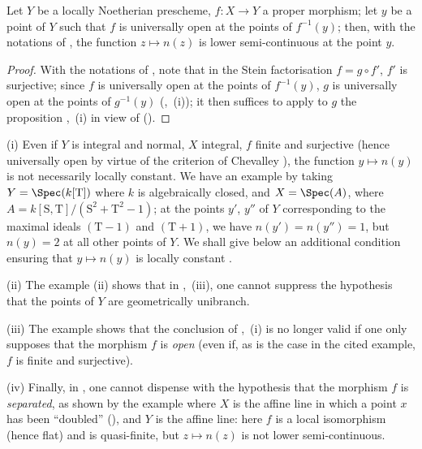 \begin{corollary}[15.5.4]
\label{IV.15.5.4}
Let $Y$ be a locally Noetherian prescheme, $f:X\to Y$ a proper morphism; let $y$ be a point of $Y$ such that $f$ is universally open at the points of $f^{-1}(y)$;
then, with the notations of , the function $z\mapsto n(z)$ is lower semi-continuous at the point $y$.
\end{corollary}

\begin{proof}
With the notations of , note that in the Stein factorisation $f=g\circ f'$, $f'$ is surjective; since $f$ is universally open at the points of $f^{-1}(y)$, $g$ is universally open at the points of $g^{-1}(y)$ (,~(i)); it then suffices to apply to $g$ the proposition ,~(i) in view of ().
\end{proof}

\begin{remarks}[15.5.5]
\label{IV.15.5.5}
(i)
Even if $Y$ is integral and normal, $X$ integral, $f$ finite and surjective (hence universally open by virtue of the criterion of Chevalley ), the function $y\mapsto n(y)$ is not necessarily locally constant.
We have an example by taking $Y=\Spec(k[\mathrm{T}])$ where $k$ is algebraically closed, and $X=\Spec(A)$, where $A=k[\mathrm{S},\mathrm{T}]/(\mathrm{S}^2+\mathrm{T}^2-1)$; at the points $y'$, $y''$ of $Y$ corresponding to the maximal ideals $(\mathrm{T}-1)$ and $(\mathrm{T}+1)$, we have $n(y')=n(y'')=1$, but $n(y)=2$ at all other points of $Y$.
We shall give below an additional condition ensuring that $y\mapsto n(y)$ is locally constant .

(ii)
The example  (ii) shows that in ,~(iii), one cannot suppress the hypothesis that the points of $Y$ are geometrically unibranch.

(iii)
The example  shows that the conclusion of ,~(i) is no longer valid if one only supposes that the morphism $f$ is \emph{open} (even if, as is the case in the cited example, $f$ is finite and surjective).

(iv)
Finally, in , one cannot dispense with the hypothesis that the morphism $f$ is \emph{separated}, as shown by the example where $X$ is the affine line in which a point $x$ has been ``doubled'' (), and $Y$ is the affine line: here $f$ is a local isomorphism (hence flat) and is quasi-finite, but $z\mapsto n(z)$ is not lower semi-continuous.
\end{remarks}

